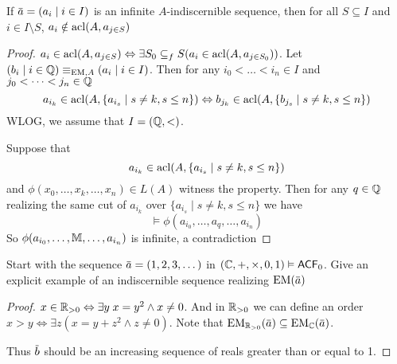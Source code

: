 \documentclass[11pt]{article}
\begin{document}
\begin{lemma}[]
If \(\bara=(a_i\mid i\in I)\) is an infinite \(A\)-indiscernible sequence, then for all \(S\subseteq I\)
and \(i\in I\setminus S\), \(a_i\notin\operatorname{acl}(A,a_{j\in S})\)
\end{lemma}

\begin{proof}
\(a_i\in\operatorname{acl}(A,a_{j\in S})\Leftrightarrow\exists S_0\subseteq_f S(a_i\in\operatorname{acl}(A,a_{j\in S_0}))\). Let \((b_i\mid i\in\mathbb{Q})\equiv_{\operatorname{EM},A}(a_i\mid i\in I)\).
Then for any \(i_0<\dots<i_n\in I\) and \(j_0<\dots<j_n\in\mathbb{Q}\)
\begin{equation*}
a_{i_k}\in\operatorname{acl}(A,\{a_{i_s}\mid s\neq k,s\le n\})\Leftrightarrow b_{j_k}\in\operatorname{acl}(A,\{b_{j_s}\mid s\neq k,s\le n\})
\end{equation*}
WLOG, we assume that \(I=(\mathbb{Q},<)\).

Suppose that
\begin{equation*}
a_{i_k}\in\operatorname{acl}(A,\{a_{i_s}\mid s\neq k,s\le n\})
\end{equation*}
and \(\phi(x_0,\dots,x_k,\dots,x_n)\in L(A)\) witness the property. Then for any \(q\in\mathbb{Q}\) realizing the same
cut of \(a_{i_k}\) over \(\{a_{i_s}\mid s\neq k,s\le n\}\) we have
\begin{equation*}
\vDash\phi(a_{i_0},\dots,a_q,\dots,a_{i_n})
\end{equation*}
So \(\phi(a_{i_0},\dots,\mathbb{M},\dots,a_{i_n})\) is infinite, a contradiction
\end{proof}

\begin{exercise}
\label{Problem1}
Start with the sequence \(\bara=(1,2,3,\dots)\) in \((\mathbb{C},+,\times,0,1)\vDash\textsf{ACF}_0\). Give an explicit example of an
indiscernible sequence realizing \(\EM(\bara)\)
\end{exercise}

\begin{proof}
\(x\in\mathbb{R}_{>0}\Leftrightarrow\exists y\; x=y^2\wedge x\neq 0\). And in \(\mathbb{R}_{>0}\) we can define an
order \(x>y\Leftrightarrow\exists z(x=y+z^2\wedge z\neq 0)\). Note that \(\EM_{\R_{>0}}(\bara)\subseteq\EM_{\C}(\bara)\).

Thus \(\barb\) should be an increasing sequence of reals greater than or equal to 1.
\end{proof}
\end{document}
